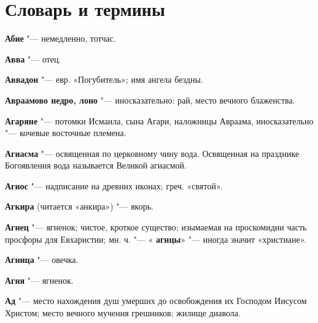 \SetupCutAtSection

\chapter{Словарь и термины}
 
\begin{mymulticols}{2}\footnotesize



\noindent\textbf{Абие} "--- немедленно, тотчас. 




\noindent\textbf{Авва} "--- отец. 




\noindent\textbf{Аввадон} "--- евр. «Погубитель»; имя ангела бездны. 




\noindent\textbf{Авраамово недро, лоно} "--- иносказательно: рай, место вечного блаженства. 




\noindent\textbf{Агаряне} "--- потомки Исмаила, сына Агари, наложницы Авраама, иносказательно "--- кочевые восточные племена. 




\noindent\textbf{Агиасма} "--- освященная по церковному чину вода. Освященная на празднике Богоявления вода называется Великой агиасмой. 




\noindent\textbf{Агиос} "--- надписание на древних иконах; греч. «святой». 




\noindent\textbf{Агкира} (читается «анкира») "--- якорь. 




\noindent\textbf{Агнец} "--- ягненок; чистое, кроткое существо; изымаемая на проскомидии часть просфоры для Евхаристии; мн. ч. "--- « \noindent\textbf{агнцы}» "--- иногда значит «христиане». 




\noindent\textbf{Агница} "--- овечка. 




\noindent\textbf{Агня} "--- ягненок. 




\noindent\textbf{Ад} "--- место нахождения душ умерших до освобождения их Господом Иисусом Христом; место вечного мучения грешников; жилище диавола. 





\end{mymulticols}
